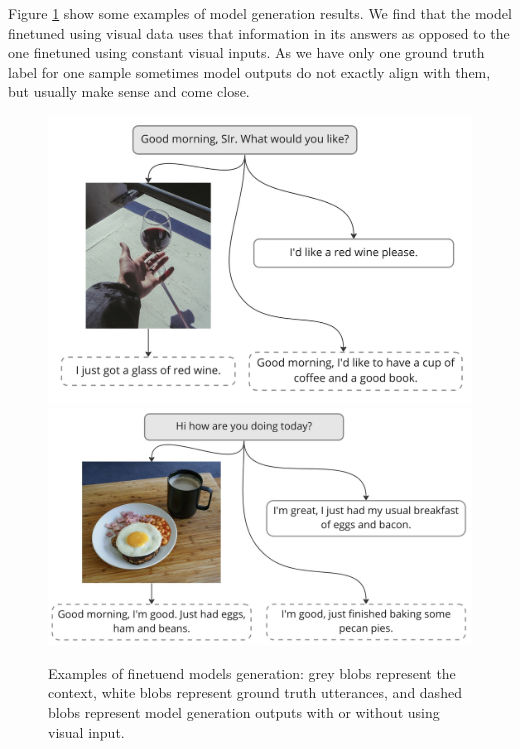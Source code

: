 Figure \ref{fig:examples} show some examples of model generation results. We find that the model finetuned using visual data uses that information in its answers as opposed to the one finetuned using constant visual inputs. As we have only one ground truth label for one sample sometimes model outputs do not exactly align with them, but usually make sense and come close.

\begin{figure}
    \centering
    \includegraphics[width=0.49\linewidth, viewport=0 0 2154 1464]{example1.jpg}
    \includegraphics[width=0.49\linewidth, viewport=0 0 1728 966]{example2.jpg}
    \caption{Examples of finetuend models generation: grey blobs represent the context, white blobs represent ground truth utterances, and dashed blobs represent model generation outputs with or without using visual input.}
    \label{fig:examples}
\end{figure}



\begin{table}
\caption{Test split metrics for both finetuned models and BlenderBot 400M.}
\label{table:test_metrics}
\centering
\tabcolsep=0.11cm
\end{table}

